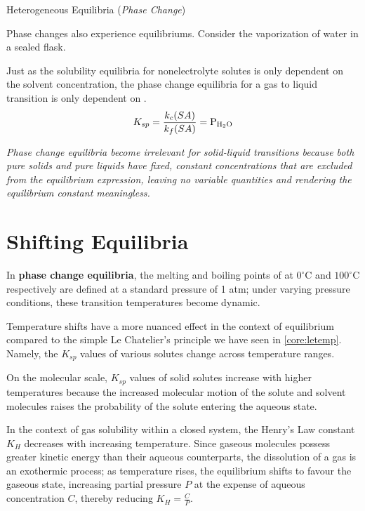 \documentclass[10pt]{article}
\begin{document}
  \begin{core}{Heterogeneous Equilibria (\textit{Phase Change})}

    Phase changes also experience equilibriums. Consider the vaporization of water in a sealed flask. 




    Just as the solubility equilibria for nonelectrolyte solutes is only dependent on the solvent concentration, the phase change equilibria for a gas to liquid transition is only dependent on .
    \[
      K_{sp} = \frac{k_c(SA)}{k_f(SA)} = \ce{P_{\ce{H2O}}}
    \]


    \textit{Phase change equilibria become irrelevant for solid-liquid transitions because both pure solids and pure liquids have fixed, constant concentrations that are excluded from the equilibrium expression, leaving no variable quantities and rendering the equilibrium constant meaningless.}

  \end{core}

\section{Shifting Equilibria}
\label{sec:shifting_eq}

  In \textbf{phase change equilibria}, the melting and boiling points of  at $0^\circ$C and $100^\circ$C respectively are defined at a standard pressure of 1 atm; under varying pressure conditions, these transition temperatures become dynamic.


  Temperature shifts have a more nuanced effect in the context of equilibrium compared to the simple Le Chatelier's principle we have seen in \autoref{core:letemp}. Namely, the $K_{sp}$ values of various solutes change across temperature ranges.


  On the molecular scale, $K_{sp}$ values of solid solutes increase with higher temperatures because the increased molecular motion of the solute and solvent molecules raises the probability of the solute entering the aqueous state.

  In the context of gas solubility within a closed system, the Henry's Law constant $K_{H}$ decreases with increasing temperature. Since gaseous molecules possess greater kinetic energy than their aqueous counterparts, the dissolution of a gas is an exothermic process; as temperature rises, the equilibrium shifts to favour the gaseous state, increasing partial pressure $P$ at the expense of aqueous concentration $C$, thereby reducing $K_{H} = \frac{C}{P}$.
  
\end{document}
